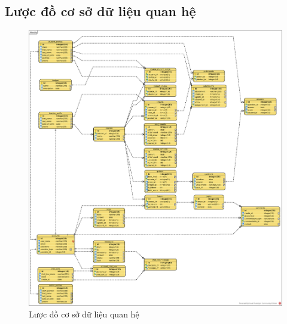\documentclass[./../main_file.tex]{subfiles}
\begin{document}
	
\subsection{Lược đồ cơ sở dữ liệu quan hệ}
	\begin{figure}[H]
		\centering
		\includegraphics[width=\linewidth]{./images/Moodle.eps}
		\caption{Lược đồ cơ sở dữ liệu quan hệ}
	\end{figure}
\end{document}
